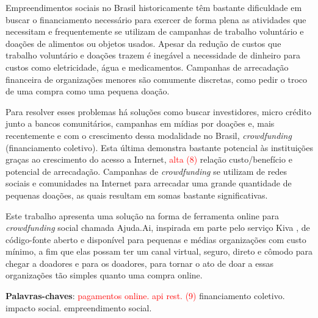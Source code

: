 \begin{resumo}
Empreendimentos sociais no Brasil historicamente têm bastante dificuldade em buscar o financiamento necessário para exercer de forma plena as atividades que necessitam e frequentemente se utilizam de campanhas de trabalho voluntário e doações de alimentos ou objetos usados. Apesar da redução de custos que trabalho voluntário e doações trazem é inegável a necessidade de dinheiro para custos como eletricidade, água e medicamentos. Campanhas de arrecadação financeira de organizações menores são comumente discretas, como pedir o troco de uma compra como uma pequena doação.

Para resolver esses problemas há soluções como buscar investidores, micro crédito junto a bancos comunitários, campanhas em mídias por doações e, mais recentemente e com o crescimento dessa modalidade no Brasil, \emph{crowdfunding} (financiamento coletivo). Esta última demonstra bastante potencial às instituições graças ao crescimento do acesso a Internet, \textcolor{red}{alta (8)} relação custo/benefício e potencial de arrecadação. Campanhas de \emph{crowdfunding} se utilizam de redes sociais e comunidades na Internet para arrecadar uma grande quantidade de pequenas doações, as quais resultam em somas bastante significativas.

Este trabalho apresenta uma solução na forma de ferramenta online para \emph{crowdfunding} social chamada Ajuda.Ai, inspirada em parte pelo serviço Kiva \cite{flannery2007kiva}, de código-fonte aberto e disponível para pequenas e médias organizações com custo mínimo, a fim que elas possam ter um canal virtual, seguro, direto e cômodo para chegar a doadores e para os doadores, para tornar o ato de doar a essas organizações tão simples quanto uma compra online.

\vspace{\onelineskip}
\noindent
\textbf{Palavras-chaves}: \textcolor{red}{pagamentos online. api rest. (9)} financiamento coletivo. impacto social. empreendimento social.
\end{resumo}